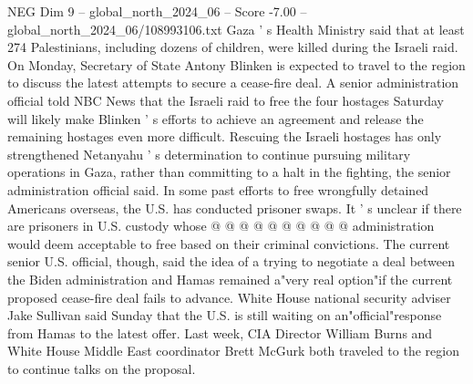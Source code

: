 \begin{textsample}{NEG Dim 9 – global\_north\_2024\_06 – Score -7.00 – global\_north\_2024\_06/108993106.txt}
Gaza ' s Health Ministry said that at least 274 Palestinians, including dozens of children, were killed during the Israeli raid.
On Monday, Secretary of State Antony Blinken is expected to travel to the region to discuss the latest attempts to secure a cease-fire deal.
A senior administration official told NBC News that the Israeli raid to free the four hostages Saturday will likely make Blinken ' s efforts to achieve an agreement and release the remaining hostages even more difficult.
Rescuing the Israeli hostages has only strengthened Netanyahu ' s determination to continue pursuing military operations in Gaza, rather than committing to a halt in the fighting, the senior administration official said.
In some past efforts to free wrongfully detained Americans overseas, the U.S. has conducted prisoner swaps.
It ' s unclear if there are prisoners in U.S. custody whose @ @ @ @ @ @ @ @ @ @ administration would deem acceptable to free based on their criminal convictions.
The current senior U.S. official, though, said the idea of a trying to negotiate a deal between the Biden administration and Hamas remained a"very real option"if the current proposed cease-fire deal fails to advance.
White House national security adviser Jake Sullivan said Sunday that the U.S. is still waiting on an"official"response from Hamas to the latest offer.
Last week, CIA Director William Burns and White House Middle East coordinator Brett McGurk both traveled to the region to continue talks on the proposal.

\end{textsample}
